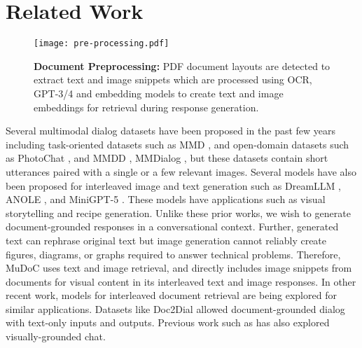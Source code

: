 \section{Related Work}
\begin{figure*}[t]
    \centering
    \texttt{[image: pre-processing.pdf]}
    \caption{\textbf{Document Preprocessing:} PDF document layouts are detected to extract text and image snippets which are processed using OCR, GPT-3/4 and embedding models to create text and image embeddings for retrieval during response generation.}
    \label{fig:preprocessing}
\end{figure*}

Several multimodal dialog datasets have been proposed in the past few years 
including task-oriented datasets such as 
MMD \cite{saha_towards_2018}, 
and open-domain datasets such as 
PhotoChat \cite{zang_photochat_2021}, 
and
MMDD \cite{lee_constructing_2021}, 
MMDialog \cite{feng_mmdialog_2023}, but these datasets contain short utterances paired with a single or a few relevant images.
Several models have also been proposed for interleaved image and text generation such as
DreamLLM \cite{dong_dreamllm_2024}, 
ANOLE \cite{chern_anole_2024},
and
MiniGPT-5 \cite{zheng_minigpt-5_2024}. 
These models have applications such as visual storytelling and recipe generation.
Unlike these prior works, we wish to generate document-grounded responses in a conversational context. 
Further, generated text can rephrase original text but image generation cannot reliably create figures, diagrams, or graphs required to answer technical problems. 
Therefore, MuDoC uses text and image retrieval, and directly includes image snippets from documents for visual content in its interleaved text and image responses.
In other recent work, models for interleaved document retrieval \cite{lee_unified_2024} are being explored for similar applications.
Datasets like Doc2Dial \cite{feng_doc2dial_2020} allowed document-grounded dialog with text-only inputs and outputs.  
Previous work such as \cite{lv_kosmos-25_2024} has also explored visually-grounded chat.